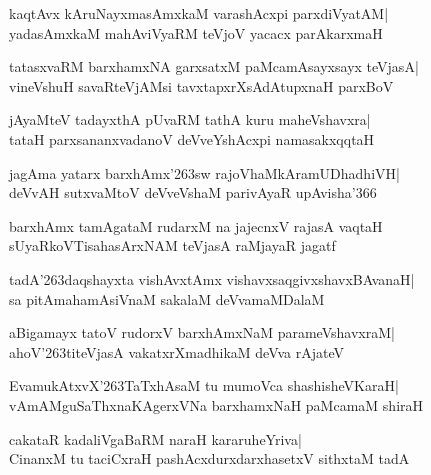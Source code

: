 \documentclass[twoside,12pt,openright]{book}
\def\S{\char'263}
\newcounter{shloka}[chapter]
\begin{document}
\begin{shloka}%
kaqtAvx kAruNayxmasAmxkaM varashAcxpi parxdiVyatAM|\\
yadasAmxkaM mahAviVyaRM teVjoV yacacx parAkarxmaH
\end{shloka}

\begin{shloka}%
tatasxvaRM barxhamxNA garxsatxM paMcamAsayxsayx teVjasA|\\
vineVshuH savaRteVjAMsi tavxtapxrXsAdAtupxnaH parxBoV
\end{shloka}

\begin{shloka}%
jAyaMteV tadayxthA pUvaRM tathA kuru maheVshavxra|\\
tataH parxsananxvadanoV deVveYshAcxpi namasakxqqtaH
\end{shloka}

\begin{shloka}%
jagAma yatarx barxhAmx\S sw rajoVhaMkAramUDhadhiVH|\\
deVvAH sutxvaMtoV deVveVshaM parivAyaR upAvisha\char'366
\end{shloka}

\begin{shloka}%
barxhAmx tamAgataM rudarxM na jajecnxV rajasA vaqtaH\\
sUyaRkoVTisahasArxNAM teVjasA raMjayaR jagatf
\end{shloka}

\begin{shloka}%
tadA\S daqshayxta vishAvxtAmx vishavxsaqgivxshavxBAvanaH|\\
sa pitAmahamAsiVnaM sakalaM deVvamaMDalaM
\end{shloka}

\begin{shloka}%
aBigamayx tatoV rudorxV barxhAmxNaM parameVshavxraM|\\
ahoV\S titeVjasA vakatxrXmadhikaM deVva rAjateV
\end{shloka}

\begin{shloka}%
EvamukAtxvX\S TaTxhAsaM tu mumoVca shashisheVKaraH|\\
vAmAMguSaThxnaKAgerxVNa barxhamxNaH paMcamaM shiraH
\end{shloka}

\begin{shloka}%
cakataR kadaliVgaBaRM naraH kararuheYriva|\\
CinanxM tu taciCxraH pashAcxdurxdarxhasetxV sithxtaM tadA
\end{shloka}
\end{document}
